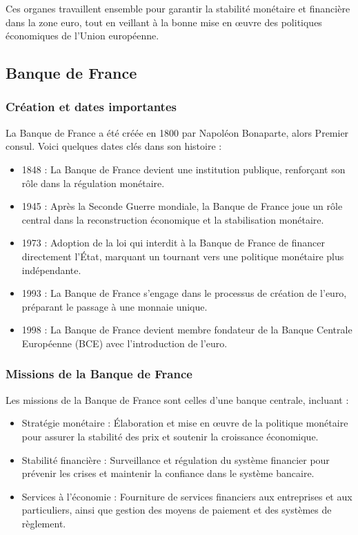 \documentclass[a4paper, 12pt]{report}
\begin{document}
Ces organes travaillent ensemble pour garantir la stabilité monétaire et financière dans la zone euro, tout en veillant à la bonne mise en œuvre des politiques économiques de l'Union européenne.
	
\subsection{Banque de France}
	
\subsubsection{Création et dates importantes}

La Banque de France a été créée en 1800 par Napoléon Bonaparte, alors Premier consul. Voici quelques dates clés dans son histoire :

\begin{itemize}
	\item 1848 : La Banque de France devient une institution publique, renforçant son rôle dans la régulation monétaire.
	\item 1945 : Après la Seconde Guerre mondiale, la Banque de France joue un rôle central dans la reconstruction économique et la stabilisation monétaire.
	\item 1973 : Adoption de la loi qui interdit à la Banque de France de financer directement l'État, marquant un tournant vers une politique monétaire plus indépendante.
	\item 1993 : La Banque de France s'engage dans le processus de création de l'euro, préparant le passage à une monnaie unique.
	\item 1998 : La Banque de France devient membre fondateur de la Banque Centrale Européenne (BCE) avec l'introduction de l'euro.
\end{itemize}

\subsubsection{Missions de la Banque de France}

Les missions de la Banque de France sont celles d'une banque centrale, incluant :

\begin{itemize}
	\item Stratégie monétaire : Élaboration et mise en œuvre de la politique monétaire pour assurer la stabilité des prix et soutenir la croissance économique.
	\item Stabilité financière : Surveillance et régulation du système financier pour prévenir les crises et maintenir la confiance dans le système bancaire.
	\item Services à l'économie : Fourniture de services financiers aux entreprises et aux particuliers, ainsi que gestion des moyens de paiement et des systèmes de règlement.
\end{itemize}
	
\end{document}
